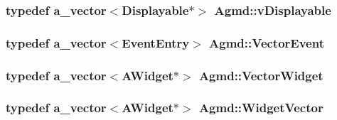 \hypertarget{namespace_agmd_a02598d92fb78e9179f0a1fb225f31df1}{
\subsubsection[{v\+Displayable}]{\setlength{\rightskip}{0pt plus 5cm}typedef {\bf a\+\_\+vector}$<${\bf Displayable}$\ast$$>$ {\bf Agmd\+::v\+Displayable}}}\label{namespace_agmd_a02598d92fb78e9179f0a1fb225f31df1}
\hypertarget{namespace_agmd_a58e024c1af9bb8a40910c507a4602953}{
\subsubsection[{Vector\+Event}]{\setlength{\rightskip}{0pt plus 5cm}typedef {\bf a\+\_\+vector}$<${\bf Event\+Entry}$>$ {\bf Agmd\+::\+Vector\+Event}}}\label{namespace_agmd_a58e024c1af9bb8a40910c507a4602953}
\hypertarget{namespace_agmd_a390261fa9cd4571caab83e2d7a34020c}{
\subsubsection[{Vector\+Widget}]{\setlength{\rightskip}{0pt plus 5cm}typedef {\bf a\+\_\+vector}$<${\bf A\+Widget}$\ast$$>$ {\bf Agmd\+::\+Vector\+Widget}}}\label{namespace_agmd_a390261fa9cd4571caab83e2d7a34020c}
\hypertarget{namespace_agmd_aef7baa69b34272786cd1f8690ca0071e}{
\subsubsection[{Widget\+Vector}]{\setlength{\rightskip}{0pt plus 5cm}typedef {\bf a\+\_\+vector}$<${\bf A\+Widget}$\ast$$>$ {\bf Agmd\+::\+Widget\+Vector}}}\label{namespace_agmd_aef7baa69b34272786cd1f8690ca0071e}


